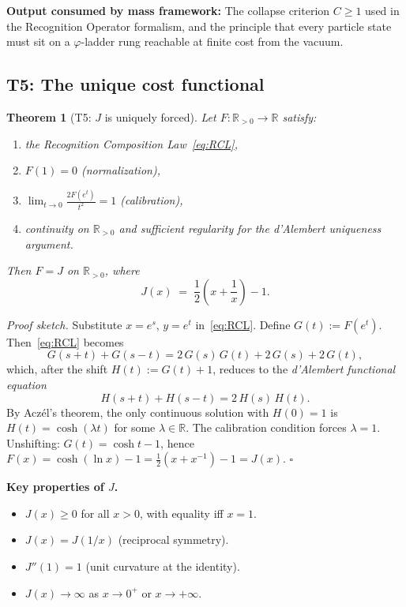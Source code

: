 \documentclass[11pt,a4paper]{article}
\newtheorem{theorem}{Theorem}[section]
\theoremstyle{definition}
\theoremstyle{remark}
\newcommand{\phig}{\varphi}
\newcommand{\Jcost}{J}
\begin{document}
\medskip
\noindent\textbf{Output consumed by mass framework:}
The collapse criterion $C \geq 1$ used in the Recognition Operator formalism,
and the principle that every particle state must sit on a $\phig$-ladder rung
reachable at finite cost from the vacuum.

\subsection{T5: The unique cost functional}

\begin{theorem}[T5: $\Jcost$ is uniquely forced]
\label{thm:T5}
Let $F : \mathbb{R}_{>0} \to \mathbb{R}$ satisfy:
\begin{enumerate}[nosep,label=(\roman*)]
  \item the Recognition Composition Law~\eqref{eq:RCL},
  \item $F(1) = 0$ \textup{(normalization)},
  \item $\displaystyle\lim_{t\to 0} \frac{2F(e^t)}{t^2} = 1$ \textup{(calibration)},
  \item continuity on $\mathbb{R}_{>0}$ and sufficient regularity for the
        d'Alembert uniqueness argument.
\end{enumerate}
Then $F = \Jcost$ on $\mathbb{R}_{>0}$, where
\begin{equation}
  \boxed{\Jcost(x) \;=\; \frac{1}{2}\!\left(x + \frac{1}{x}\right) - 1.}
  \label{eq:Jcost}
\end{equation}
\end{theorem}

\noindent\textit{Proof sketch.}\quad
Substitute $x = e^s$, $y = e^t$ in~\eqref{eq:RCL}.  Define $G(t) := F(e^t)$.
Then~\eqref{eq:RCL} becomes
\[
  G(s+t) + G(s-t) = 2\,G(s)\,G(t) + 2\,G(s) + 2\,G(t),
\]
which, after the shift $H(t) := G(t) + 1$, reduces to the \emph{d'Alembert
functional equation}
\[
  H(s+t) + H(s-t) = 2\,H(s)\,H(t).
\]
By Acz\'el's theorem, the only continuous solution with $H(0) = 1$ is
$H(t) = \cosh(\lambda t)$ for some $\lambda \in \mathbb{R}$.
The calibration condition forces $\lambda = 1$.
Unshifting: $G(t) = \cosh t - 1$, hence $F(x) = \cosh(\ln x) - 1
= \tfrac{1}{2}(x + x^{-1}) - 1 = \Jcost(x)$.
\hfill$\square$

\medskip
\noindent\textbf{Key properties of $\Jcost$.}
\begin{itemize}[nosep]
  \item $\Jcost(x) \geq 0$ for all $x > 0$, with equality iff $x = 1$.
  \item $\Jcost(x) = \Jcost(1/x)$ (reciprocal symmetry).
  \item $\Jcost''(1) = 1$ (unit curvature at the identity).
  \item $\Jcost(x) \to \infty$ as $x \to 0^+$ or $x \to +\infty$.
\end{itemize}
\end{document}
